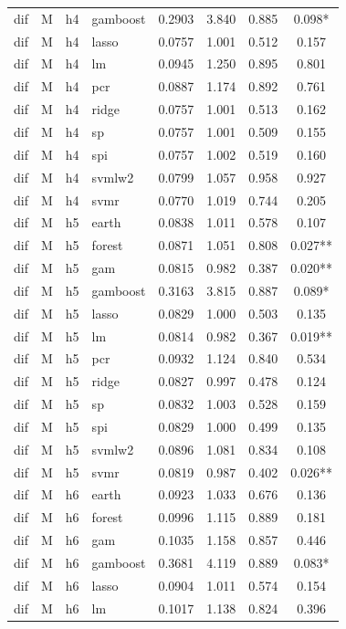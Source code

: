 \begin{ThreePartTable}
\begin{longtable}[t]{llclcccc}
dif & M & h4 & gamboost & 0.2903 & 3.840 & 0.885 & 0.098*\\
dif & M & h4 & lasso & 0.0757 & 1.001 & 0.512 & 0.157\\
dif & M & h4 & lm & 0.0945 & 1.250 & 0.895 & 0.801\\
dif & M & h4 & pcr & 0.0887 & 1.174 & 0.892 & 0.761\\
dif & M & h4 & ridge & 0.0757 & 1.001 & 0.513 & 0.162\\
dif & M & h4 & sp & 0.0757 & 1.001 & 0.509 & 0.155\\
dif & M & h4 & spi & 0.0757 & 1.002 & 0.519 & 0.160\\
dif & M & h4 & svmlw2 & 0.0799 & 1.057 & 0.958 & 0.927\\
dif & M & h4 & svmr & 0.0770 & 1.019 & 0.744 & 0.205\\
\addlinespace
dif & M & h5 & earth & 0.0838 & 1.011 & 0.578 & 0.107\\
dif & M & h5 & forest & 0.0871 & 1.051 & 0.808 & 0.027**\\
dif & M & h5 & gam & 0.0815 & 0.982 & 0.387 & 0.020**\\
dif & M & h5 & gamboost & 0.3163 & 3.815 & 0.887 & 0.089*\\
dif & M & h5 & lasso & 0.0829 & 1.000 & 0.503 & 0.135\\
dif & M & h5 & lm & 0.0814 & 0.982 & 0.367 & 0.019**\\
dif & M & h5 & pcr & 0.0932 & 1.124 & 0.840 & 0.534\\
dif & M & h5 & ridge & 0.0827 & 0.997 & 0.478 & 0.124\\
dif & M & h5 & sp & 0.0832 & 1.003 & 0.528 & 0.159\\
dif & M & h5 & spi & 0.0829 & 1.000 & 0.499 & 0.135\\
dif & M & h5 & svmlw2 & 0.0896 & 1.081 & 0.834 & 0.108\\
dif & M & h5 & svmr & 0.0819 & 0.987 & 0.402 & 0.026**\\
\addlinespace
dif & M & h6 & earth & 0.0923 & 1.033 & 0.676 & 0.136\\
dif & M & h6 & forest & 0.0996 & 1.115 & 0.889 & 0.181\\
dif & M & h6 & gam & 0.1035 & 1.158 & 0.857 & 0.446\\
dif & M & h6 & gamboost & 0.3681 & 4.119 & 0.889 & 0.083*\\
dif & M & h6 & lasso & 0.0904 & 1.011 & 0.574 & 0.154\\
dif & M & h6 & lm & 0.1017 & 1.138 & 0.824 & 0.396\\

\end{longtable}
\end{ThreePartTable}
